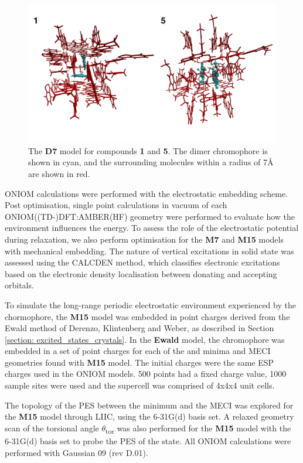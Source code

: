\begin{figure}
\centering
  \includegraphics[width=0.9\linewidth]{4IntraInterInteractions/HC_Dimer_Models.pdf}
  \caption[The \textbf{D7} cluster models]{The \textbf{D7} model for compounds \textbf{1} and \textbf{5}. The dimer chromophore is shown in cyan, and the surrounding molecules within a radius of 7{\AA} are shown in red.}
  \label{figure: HC_Dimer_Models}
\end{figure}

ONIOM calculations were performed with the electrostatic embedding scheme. Post optimisation, single point calculations in vacuum of each ONIOM((TD-)DFT:AMBER(HF) geometry were performed to evaluate how the environment influences the energy. To assess the role of the electrostatic potential during relaxation, we also perform optimisation for the \textbf{M7} and \textbf{M15} models with mechanical embedding. The nature of vertical excitations in solid state was assessed using the CALCDEN method, which classifies electronic excitations based on the electronic density localisation between donating and accepting orbitals.\cite{Crespo-Otero2012,Sen2013} 

To simulate the long-range periodic electrostatic environment experienced by the chormophore, the \textbf{M15} model was embedded in point charges derived from the Ewald method of Derenzo, Klintenberg and Weber, as described in Section \ref{section: excited_states_crystals}.\cite{Klintenberg2000,Derenzo2000} In the \textbf{Ewald} model, the chromophore was embedded in a set of point charges for each of the \szero{} and \sone{} minima and MECI geometries found with \textbf{M15} model. The initial charges were the same ESP charges used in the ONIOM models. 500 points had a fixed charge value, 1000 sample sites were used and the supercell was comprised of 4x4x4 unit cells.

The topology of the PES between the \Kstar{} minimum and the MECI was explored for the \textbf{M15} model through \ac{LIIC}, using the 6-31G(d) basis set. A relaxed geometry scan of the torsional angle $\theta$\textsubscript{tor} was also performed for the \textbf{M15} model with the 6-31G(d) basis set to probe the \ac{PES} of the \Kstar{} state. All ONIOM calculations were performed with Gaussian 09 (rev D.01).\cite{g09}

